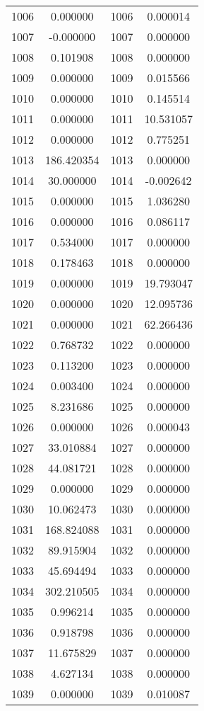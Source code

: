 \documentclass[12pt]{article}
\begin{document}
\begin{longtable}{@{}cccc@{}}
1006 & 0.000000 & 1006 & 0.000014 \\
1007 & -0.000000 & 1007 & 0.000000 \\
1008 & 0.101908 & 1008 & 0.000000 \\
1009 & 0.000000 & 1009 & 0.015566 \\
1010 & 0.000000 & 1010 & 0.145514 \\
1011 & 0.000000 & 1011 & 10.531057 \\
1012 & 0.000000 & 1012 & 0.775251 \\
1013 & 186.420354 & 1013 & 0.000000 \\
1014 & 30.000000 & 1014 & -0.002642 \\
1015 & 0.000000 & 1015 & 1.036280 \\
1016 & 0.000000 & 1016 & 0.086117 \\
1017 & 0.534000 & 1017 & 0.000000 \\
1018 & 0.178463 & 1018 & 0.000000 \\
1019 & 0.000000 & 1019 & 19.793047 \\
1020 & 0.000000 & 1020 & 12.095736 \\
1021 & 0.000000 & 1021 & 62.266436 \\
1022 & 0.768732 & 1022 & 0.000000 \\
1023 & 0.113200 & 1023 & 0.000000 \\
1024 & 0.003400 & 1024 & 0.000000 \\
1025 & 8.231686 & 1025 & 0.000000 \\
1026 & 0.000000 & 1026 & 0.000043 \\
1027 & 33.010884 & 1027 & 0.000000 \\
1028 & 44.081721 & 1028 & 0.000000 \\
1029 & 0.000000 & 1029 & 0.000000 \\
1030 & 10.062473 & 1030 & 0.000000 \\
1031 & 168.824088 & 1031 & 0.000000 \\
1032 & 89.915904 & 1032 & 0.000000 \\
1033 & 45.694494 & 1033 & 0.000000 \\
1034 & 302.210505 & 1034 & 0.000000 \\
1035 & 0.996214 & 1035 & 0.000000 \\
1036 & 0.918798 & 1036 & 0.000000 \\
1037 & 11.675829 & 1037 & 0.000000 \\
1038 & 4.627134 & 1038 & 0.000000 \\
1039 & 0.000000 & 1039 & 0.010087 \\

\end{longtable}
\end{document}
